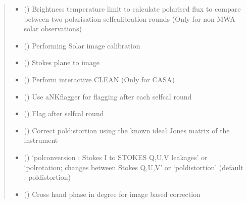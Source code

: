 \documentclass[letterpaper,10pt,english]{sphinxmanual}
\begin{document}
\begin{fulllineitems}
\begin{fulllineitems}
\begin{quote}
\begin{description}
\begin{itemize}
\item {} 
\sphinxAtStartPar
{} () \textendash{} Brightness temperature limit to calculate polarised flux to compare between two polarisation self\sphinxhyphen{}calibration rounds (Only for non MWA solar observations)

\item {} 
\sphinxAtStartPar
{} () \textendash{} Performing Solar image calibration

\item {} 
\sphinxAtStartPar
{} () \textendash{} Stokes plane to image

\item {} 
\sphinxAtStartPar
{} () \textendash{} Perform interactive CLEAN (Only for CASA)

\item {} 
\sphinxAtStartPar
{} () \textendash{} Use aNKflagger for flagging after each selfcal round

\item {} 
\sphinxAtStartPar
{} () \textendash{} Flag after selfcal round

\item {} 
\sphinxAtStartPar
{} () \textendash{} Correct poldistortion using the known ideal Jones matrix of the instrument

\item {} 
\sphinxAtStartPar
{} () \textendash{} ‘polconversion ; Stokes I to STOKES Q,U,V leakages’ or ‘polrotation; changes between Stokes Q,U,V’ or ‘poldistortion’ (default : poldistortion)

\item {} 
\sphinxAtStartPar
{} () \textendash{} Cross hand phase in degree for image based correction


\end{itemize}
\end{description}
\end{quote}
\end{fulllineitems}
\end{fulllineitems}
\end{document}

